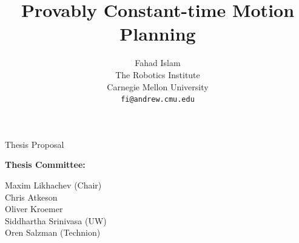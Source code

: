 \documentclass[a4paper,10pt]{article}
\title{Provably Constant-time Motion Planning}
\author{Fahad Islam\\
The Robotics Institute\\
Carnegie Mellon University\\
\texttt{fi@andrew.cmu.edu}}
\begin{document}
\maketitle

\begin{center}
\Large{Thesis Proposal}
\vspace{40mm}

\large{
\textbf{Thesis Committee:}

Maxim Likhachev (Chair)\\
Chris Atkeson\\
Oliver Kroemer\\
Siddhartha Srinivasa (UW)\\
Oren Salzman (Technion)\\
}
\end{center}
\newpage
\end{document}
